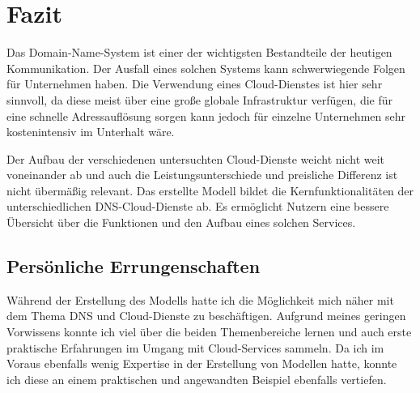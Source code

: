 \section{Fazit}
Das Domain-Name-System ist einer der wichtigsten Bestandteile der heutigen Kommunikation. Der Ausfall eines solchen Systems kann schwerwiegende Folgen für Unternehmen haben. Die Verwendung eines Cloud-Dienstes ist hier sehr sinnvoll, da diese meist über eine große globale Infrastruktur verfügen, die für eine schnelle Adressauflösung sorgen kann jedoch für einzelne Unternehmen sehr kostenintensiv im Unterhalt wäre.

Der Aufbau der verschiedenen untersuchten Cloud-Dienste weicht nicht weit voneinander ab und auch die Leistungsunterschiede und preisliche Differenz ist nicht übermäßig relevant. Das erstellte Modell bildet die Kernfunktionalitäten der unterschiedlichen DNS-Cloud-Dienste ab. Es ermöglicht Nutzern eine bessere Übersicht über die Funktionen und den Aufbau eines solchen Services. 

\subsection{Persönliche Errungenschaften}
Während der Erstellung des Modells hatte ich die Möglichkeit mich näher mit dem Thema DNS und Cloud-Dienste zu beschäftigen. Aufgrund meines geringen Vorwissens konnte ich viel über die beiden Themenbereiche lernen und auch erste praktische Erfahrungen im Umgang mit Cloud-Services sammeln. Da ich im Voraus ebenfalls wenig Expertise in der Erstellung von Modellen hatte, konnte ich diese an einem praktischen und angewandten Beispiel ebenfalls vertiefen.
